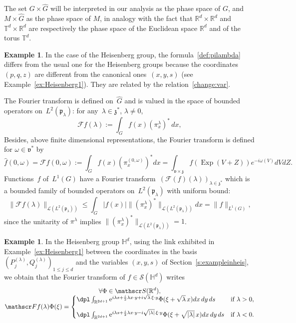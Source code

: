 \documentclass[JEP,XML,SOM,Unicode,published]{cedram}
\let\mathcal\mathscr
\newcommand{\rme}{\mathrm{e}}
\DeclareMathOperator{\Exp}{Exp}
\theoremstyle{plain}
\theoremstyle{definition}
\newtheorem{example}[theorem]{Example}
\def\R{{\mathbb R}}
\def\T{{\mathbb T}}
\def\bbH{{\mathbb H}}
\begin{document}
The set $G\times \widehat G$ will be interpreted in our analysis as the phase space of $G$, and $M\times \widehat G$ as the phase space of $M$, in analogy with the fact that $\R^d\times \R^d$ and $\T^d\times \R^d$ are respectively the phase space of the Euclidean space $\R^d$ and of the torus $\T^d$.

\begin{example}
In the case of the Heisenberg group, the formula~\eqref{def:pilambda} differs from
the usual one for the Heisenberg groups \cite[Eq.\,(2.23) in Chap.\,1]{Tay} because the coordinates $(p,q,z)$ are different from the canonical ones~$(x,y,s)$ (see Example~\ref{ex:Heisenberg1}). They are related by the relation~\eqref{change:var}.
\end{example}

The Fourier transform is defined on~$\widehat G$ and is valued in the space of bounded operators
on~$L^2(\mathfrak p_\lambda)$:
for any~$\lambda\in{\mathfrak z}^*$, $\lambda\not=0$,
\begin{equation} \label{e:fouriertransform}
{\mathcal F}f(\lambda):=
\int_G f(x)\left(\pi^{\lambda}_{x }\right)^* \, dx,
\end{equation}
Besides, above finite dimensional representations, the Fourier transform is defined
for $\omega\in \mathfrak v^*$ by
\[
\widehat f(0,\omega)=
\mathcal F f (0,\omega)
:= \int_G f(x) (\pi^{(0,\omega)}_x)^* dx
=\int_{\mathfrak v \times \mathfrak z}
f(\Exp(V+Z)) e^{-i\omega(V)} dV dZ.	
\]
Functions~$f$ of~$L^1(G)$ have a Fourier transform~$\left({\mathcal F}(f)(\lambda)\right)_{\lambda\in \mathfrak z^*}$ which is a bounded family of bounded operators on~$L^2(\mathfrak p_\lambda)$
with uniform bound:
\[
\|\mathcal Ff (\lambda) \|_{{\mathcal L}(L^2(\mathfrak p_\lambda))}
\leq
\int_G |f(x)|\|(\pi^\lambda_x)^* \|_{{\mathcal L}(L^2(\mathfrak p_\lambda))} dx
=
\|f\|_{L^1(G)},
\]
since the unitarity of $\pi^\lambda$ implies $\|(\pi^\lambda_x)^* \|_{{\mathcal L}(L^2(\mathfrak p_\lambda))}=1$.

\begin{example}\label{ex:Heisenberg2}
In the Heisenberg group $\bbH^d$, using the link exhibited in Example~\ref{ex:Heisenberg1} between the coordinates in the basis $(P_j^{(\lambda)},Q_j^{(\lambda)})_{1\leq j\leq d}$ and the variables $(x,y,s)$ of Section~\ref{s:exampleinheis}, we obtain that the Fourier transform of $f\in\mathcal S(\bbH^d)$ writes
\begin{multline*}
\forall \Phi\in \mathcal S(\R^d),\\[-5pt]
\mathcal Ff(\lambda) \Phi(\xi)=
\begin{cases}
\dpl
\int_{\R^{2d+1} }\rme^{i\lambda s + \frac i 2 \lambda x\cdot y + i\sqrt\lambda\, \xi\cdot y } \Phi(\xi +\sqrt\lambda \,x) dx\, dy\, ds& \text{if } \lambda>0,\\[8pt]
\dpl\int_{\R^{2d+1} }\rme^{i\lambda s + \frac i 2 \lambda x\cdot y - i\sqrt{|\lambda|}\, \xi\cdot y } \Phi(\xi +\sqrt{|\lambda|} \, x) dx\, dy\, ds& \text{if } \lambda<0.
\end{cases}
\end{multline*}
\end{example}
\end{document}
